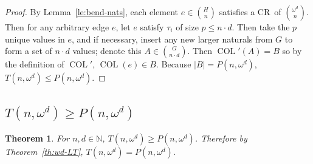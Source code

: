 \documentclass[10pt,a4paper]{article}
\newcommand{\om}{\omega}
\newcommand{\COL}{\operatorname{COL}}
\newcommand{\N}{\mathbb{N}}
\newcommand{\crulenospace}{CR}
\newcommand{\crule}{\crulenospace~}
\newcommand{\numpoints}{n}
\newcommand{\Commonconst}{A}
\newcommand{\Rareconst}{B}
\theoremstyle{plain}
\newtheorem{theorem}{Theorem}[section]
\theoremstyle{definition}
\begin{document}
\begin{proof}
By Lemma~\ref{le:bend-nats}, each element $e \in \binom{H}{\numpoints}$ satisfies a \crule of $\binom{\om^d}{\numpoints}$. 
Then for any arbitrary edge $e$, let $e$ satisfy $\tau_i$ of size $p \leq \numpoints \cdot d$. 
Then take the $p$ unique values in $e$, and if necessary, insert any new larger naturals from 
$G$ to form a set of $\numpoints \cdot d$ values; denote this $\Commonconst \in \binom{G}{\numpoints \cdot d}$.
Then
$\COL'(\Commonconst) = \Rareconst$ so by the definition of $\COL'$, $\COL(e) \in \Rareconst$. 
Because $|\Rareconst| = P(\numpoints,\om^d)$, $T(\numpoints,\om^d) \leq P(\numpoints,\om^d)$.
\end{proof}

\subsection{\texorpdfstring{$T(\numpoints,\omega^d) \geq P(\numpoints, \om^d)$}{T(\numpoints, omega d) >= P(\numpoints, omega d)}}


\begin{theorem}\label{th:wd-GT}
For $\numpoints,d \in \N$, $T\left(\numpoints,\om^d\right) \geq P\left(\numpoints,\om^d\right)$. Therefore by Theorem~\ref{th:wd-LT}, $T(\numpoints,\om^d) =  P(\numpoints,\om^d)$.
\end{theorem} 
\end{document}
